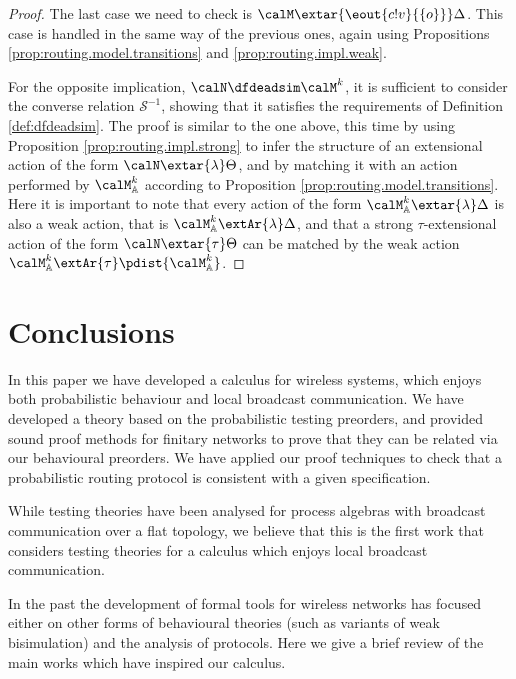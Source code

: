 \documentclass{LMCS}
\begin{document}
\begin{proof}
\noindent The last case we need to check is $\calM \extar{\eout{c!v}{\{o\}}} \Delta$. 
This case is handled in the same way of the previous ones, again using 
Propositions \ref{prop:routing.model.transitions} 
and \ref{prop:routing.impl.weak}.

For the opposite implication, $\calN \dfdeadsim \calM^k$,
it is sufficient to consider the converse relation ${\mathcal S}^{-1}$, 
showing that it satisfies the requirements of Definition \ref{def:dfdeadsim}.
The proof is similar to the one above, this time by using 
Proposition \ref{prop:routing.impl.strong} to infer the 
structure of an extensional action of the form 
$\calN \extar{\lambda} \Theta$, and by matching 
it with an action performed by $\calM^k_{\mathbb{A}}$ 
according to Proposition \ref{prop:routing.model.transitions}. 
Here it is important to note that every action of the 
form $\calM^k_{\mathbb{A}} \extar{\lambda} \Delta$ is also a  
weak action, that is $\calM^k_{\mathbb{A}} \extAr{\lambda} \Delta$, 
and that a strong $\tau$-extensional action of the form 
$\calN \extar{\tau} \Theta$ can be matched by the weak 
action $\calM^k_{\mathbb{A}} \extAr{\tau} \pdist{\calM^k_{\mathbb{A}}}$.
\end{proof}

\section{Conclusions}
\label{sec:conclusions}

In this paper we have developed a calculus for wireless systems, which enjoys both probabilistic behaviour 
and local broadcast communication. We have developed a theory based on the probabilistic testing preorders, 
and provided sound proof methods for finitary networks to prove that they can be related via our behavioural preorders.
We have applied our proof techniques to check that a probabilistic routing protocol is consistent 
with a given specification.

While testing theories have been analysed for process algebras \cite{Ene02} with broadcast communication 
over a flat topology, we believe that this is the first work that considers testing theories for 
a calculus which enjoys local broadcast communication.

In the past the development of formal tools for wireless networks has focused either on other forms of 
behavioural theories (such as variants of weak bisimulation) and the analysis of protocols. Here we give a brief 
review of the main works which have inspired our calculus.
\end{document}

